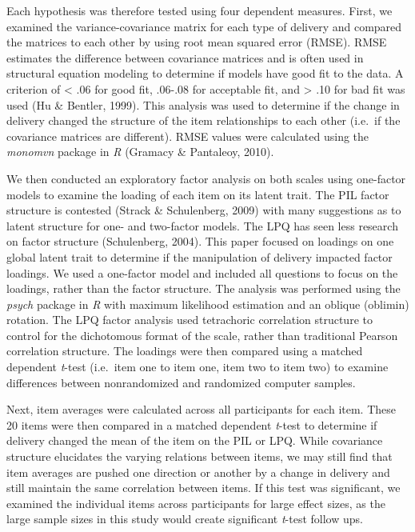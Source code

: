 \documentclass[english,man, mask]{apa6}
\theoremstyle{definition}
\theoremstyle{definition}
\theoremstyle{definition}
\theoremstyle{remark}
\begin{document}
Each hypothesis was therefore tested using four dependent measures.
First, we examined the variance-covariance matrix for each type of
delivery and compared the matrices to each other by using root mean
squared error (RMSE). RMSE estimates the difference between covariance
matrices and is often used in structural equation modeling to determine
if models have good fit to the data. A criterion of \textless{} .06 for
good fit, .06-.08 for acceptable fit, and \textgreater{} .10 for bad fit
was used (Hu \& Bentler, 1999). This analysis was used to determine if
the change in delivery changed the structure of the item relationships
to each other (i.e.~if the covariance matrices are different). RMSE
values were calculated using the \emph{monomvn} package in \emph{R}
(Gramacy \& Pantaleoy, 2010).

We then conducted an exploratory factor analysis on both scales using
one-factor models to examine the loading of each item on its latent
trait. The PIL factor structure is contested (Strack \& Schulenberg,
2009) with many suggestions as to latent structure for one- and
two-factor models. The LPQ has seen less research on factor structure
(Schulenberg, 2004). This paper focused on loadings on one global latent
trait to determine if the manipulation of delivery impacted factor
loadings. We used a one-factor model and included all questions to focus
on the loadings, rather than the factor structure. The analysis was
performed using the \emph{psych} package in \emph{R} with maximum
likelihood estimation and an oblique (oblimin) rotation. The LPQ factor
analysis used tetrachoric correlation structure to control for the
dichotomous format of the scale, rather than traditional Pearson
correlation structure. The loadings were then compared using a matched
dependent \emph{t}-test (i.e.~item one to item one, item two to item
two) to examine differences between nonrandomized and randomized
computer samples.

Next, item averages were calculated across all participants for each
item. These 20 items were then compared in a matched dependent
\emph{t}-test to determine if delivery changed the mean of the item on
the PIL or LPQ. While covariance structure elucidates the varying
relations between items, we may still find that item averages are pushed
one direction or another by a change in delivery and still maintain the
same correlation between items. If this test was significant, we
examined the individual items across participants for large effect
sizes, as the large sample sizes in this study would create significant
\emph{t}-test follow ups.
\end{document}
